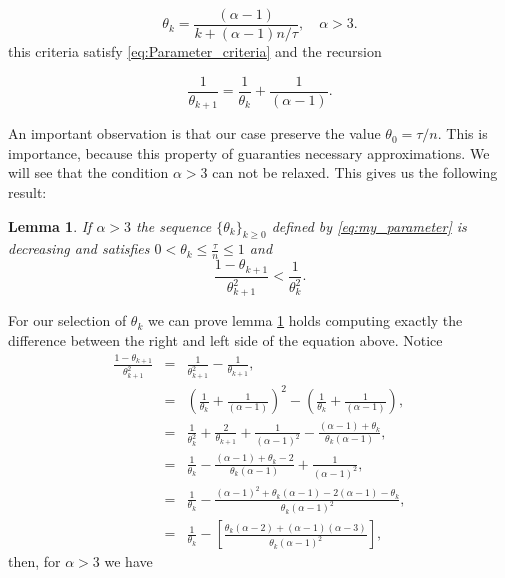 \documentclass{article}
\newtheorem{lema}{Lemma}
\begin{document}
\begin{equation}
	\label{eq:my_parameter}
	\theta_k = \frac{(\alpha-1)}{k + \left(\alpha-1\right)n/\tau}, \quad \alpha > 3.
\end{equation}  
this criteria satisfy \eqref{eq:Parameter_criteria} and the recursion

\begin{equation}
	\label{eq:parameter_recursion}
	\frac{1}{\theta_{k+1}} = \frac{1}{\theta_k} + \frac{1}{(\alpha-1)}.
\end{equation} 

An important observation is that our case preserve the value $\theta_0 = \tau/n$. This is importance, because this property of guaranties necessary approximations. We will see that the condition $\alpha > 3$ can not be relaxed.  This gives us the following result:

\begin{lema}
If $\alpha > 3$ the sequence $\lbrace \theta_k \rbrace_{k\geq 0}$ defined by \eqref{eq:my_parameter} is decreasing and satisfies $0 < \theta_k \leq \frac{\tau}{n} \leq 1$ and
	\begin{equation*}
		\frac{1-\theta_{k+1}}{\theta^2_{k+1}} < \frac{1}{\theta_k^2}. 
	\end{equation*}
\label{lema_1}
\end{lema}

\noindent For our  selection of $\theta_k$ we can prove lemma \ref{lema_1} holds computing exactly the difference between the right and left side of the equation above. Notice
\begin{eqnarray*}
\frac{1-\theta_{k+1}}{\theta_{k+1}^2} &=& \frac{1}{\theta_{k+1}^2} - \frac{1}{\theta_{k+1}}, \\
&=& \left(\frac{1}{\theta_k} + \frac{1}{(\alpha-1)} \right)^2 - \left(\frac{1}{\theta_k}+\frac{1}{(\alpha-1)} \right), \\
&=& \frac{1}{\theta_k^2} + \frac{2}{\theta_{k+1}} + \frac{1}{(\alpha-1)^2}-\frac{(\alpha-1)+\theta_k}{\theta_k(\alpha-1)}, \\
&=& \frac{1}{\theta_k} - \frac{(\alpha-1)+\theta_k-2}{\theta_k(\alpha-1)} + \frac{1}{(\alpha-1)^2},\\
&=& \frac{1}{\theta_k} - \frac{(\alpha-1)^2+\theta_k(\alpha-1)-2(\alpha-1)-\theta_k}{\theta_k(\alpha-1)^2}, \\
&=& \frac{1}{\theta_k} - \left[\frac{\theta_k(\alpha-2)+(\alpha-1)(\alpha-3)}{\theta_k(\alpha-1)^2} \right],
\end{eqnarray*}
then, for $\alpha > 3$ we have
\end{document}
